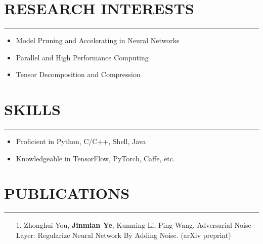\documentclass{res}
\begin{document}
\begin{resume}
\section{RESEARCH INTERESTS}
\vspace{-1ex}
\noindent\rule[0.1\baselineskip]{\textwidth}{1pt}
\begin{itemize}\setlength{\itemsep}{-0.5ex}
    \item Model Pruning and Accelerating in Neural Networks
    \item Parallel and High Performance Computing
    \item Tensor Decomposition and Compression
\end{itemize}





\section{SKILLS}
\vspace{-1ex}
\noindent\rule[0.1\baselineskip]{\textwidth}{1pt}
\begin{itemize}\setlength{\itemsep}{-0.5ex}
\item Proficient in Python, C/C++, Shell, Java
\item Knowledgeable in TensorFlow, PyTorch, Caffe, etc.
\end{itemize}


\section{PUBLICATIONS}
\vspace{-1ex}
\noindent\rule[0.1\baselineskip]{\textwidth}{1pt}
\begin{itemize}\setlength{\itemsep}{-0.5ex}
    \item[1.] Zhonghui You, \textbf{Jinmian Ye}, Kunming Li,  Ping Wang. Adversarial Noise Layer: Regularize Neural Network By Adding Noise. (arXiv preprint)
    

\end{itemize}
\end{resume}
\end{document}
